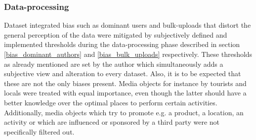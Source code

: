 \subsubsection{Data-processing} Dataset integrated bias such as dominant users and bulk-uploads that distort the general perception of the data were mitigated by subjectively defined and implemented thresholds during the data-processing phase described in section \ref{bias_dominant_authors} and \ref{bias_bulk_uploads} respectively. These thresholds as already mentioned are set by the author which simultaneously adds a subjective view and alteration to every dataset. Also, it is to be expected that these are not the only biases present. Media objects for instance by tourists and locals were treated with equal importance, even though the latter should have a better knowledge over the optimal places to perform certain activities. Additionally, media objects which try to promote e.g. a product, a location, an activity or which are influenced or sponsored by a third party were not specifically filtered out.\\

